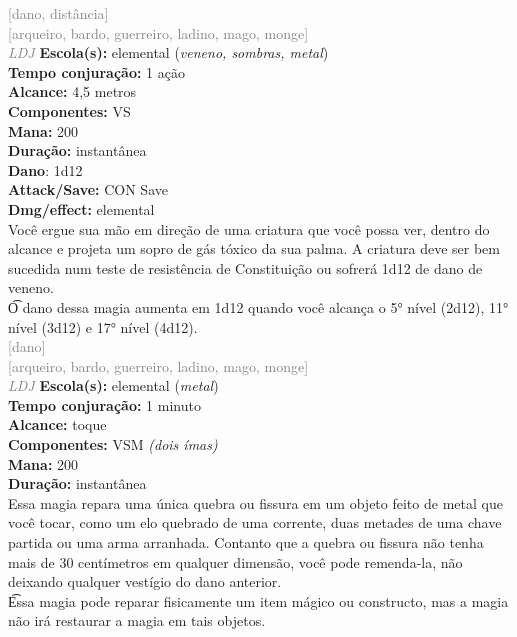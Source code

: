 \documentclass{RPG_Adventure}[2021/10/20]
\begin{document}
{\scriptsize \textcolor{gray}{[dano, distância]\\}}
{\scriptsize \textcolor{gray}{[arqueiro, bardo, guerreiro, ladino, mago, monge]\\}}
{\tiny \textcolor{gray}{\textit{LDJ}}}
{\small \t \textbf{Escola(s):} elemental (\textit{veneno, sombras, metal})\\\t \textbf{Tempo conjuração:} 1 ação\\\t \textbf{Alcance:} 4,5 metros\\\t \textbf{Componentes:} VS\\\t \textbf{Mana:} 200\\\t \textbf{Duração:} instantânea\\\t \textbf{Dano}: 1d12\\\t \textbf{Attack/Save:} CON Save\\\t \textbf{Dmg/effect:} elemental\\}
{\normalsize Você ergue sua mão em direção de uma criatura que você possa ver, dentro do alcance e projeta um sopro de gás tóxico da sua palma. A criatura deve ser bem sucedida num teste de resistência de Constituição ou sofrerá 1d12 de dano de veneno.\\\t O dano dessa magia aumenta em 1d12 quando você alcança o 5° nível (2d12), 11° nível (3d12) e 17° nível (4d12).\\}
{\scriptsize \textcolor{gray}{[dano]\\}}
{\scriptsize \textcolor{gray}{[arqueiro, bardo, guerreiro, ladino, mago, monge]\\}}
{\tiny \textcolor{gray}{\textit{LDJ}}}
{\small \t \textbf{Escola(s):} elemental (\textit{metal})\\\t \textbf{Tempo conjuração:} 1 minuto\\\t \textbf{Alcance:} toque\\\t \textbf{Componentes:} VSM \textit{(dois ímas)}\\\t \textbf{Mana:} 200\\\t \textbf{Duração:} instantânea\\}
{\normalsize Essa magia repara uma única quebra ou fissura em um objeto feito de metal que você tocar, como um elo quebrado de uma corrente, duas metades de uma chave partida ou uma arma arranhada. Contanto que a quebra ou fissura não tenha mais de 30 centímetros em qualquer dimensão, você pode remenda-la, não deixando qualquer vestígio do dano anterior.\\\t Essa magia pode reparar fisicamente um item mágico ou constructo, mas a magia não irá restaurar a magia em tais objetos.\\}
\end{document}
